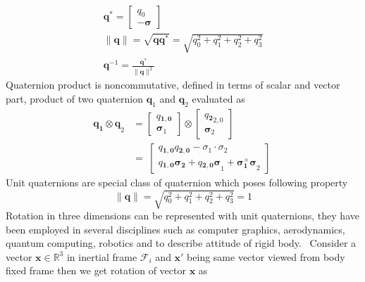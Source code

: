 \begin{gather}
\mathbf{q}^{*} =\begin{bmatrix}
q_{0}\\
-\mathbf{\sigma }
\end{bmatrix} \ \\
\| \mathbf{q} \| =\sqrt{\mathbf{qq}^{*}} =\sqrt{q^{2}_{0} +q^{2}_{1} +q^{2}_{2} +q^{2}_{3}}\\
\mathbf{q}^{-1} =\frac{\mathbf{q}^{*}}{\| \mathbf{q} \| ^{2}}
\end{gather}
Quaternion product is noncommutative, defined in terms of scalar and vector part, product of two quaternion $\displaystyle \mathbf{q}_{1}$ and $\displaystyle \mathbf{q}_{2}$ evaluated as 
\begin{equation}
\label{quatProduct}
\begin{aligned}
\mathbf{q_{1} \otimes q}_{2} & =\begin{bmatrix}
q\mathbf{_{1,0}}\\
{\mathbf{\sigma }_{1}}
\end{bmatrix} \otimes \begin{bmatrix}
{q\mathbf{_{2}}}_{2,0}\\
{\mathbf{\sigma }_{2}}
\end{bmatrix}\\
 & =\ \begin{bmatrix}
q\mathbf{_{1,0}} q\mathbf{_{2,0}} -\sigma _{1} \cdot \sigma _{2}\\
q\mathbf{_{1,0} \sigma _{2}} +q\mathbf{_{2,0} \sigma }_{1} +\mathbf{\sigma ^{\times }_{1} \sigma }_{2}
\end{bmatrix}
\end{aligned} \ 
\end{equation}
Unit quaternions are special class of quaternion which poses following property
\begin{equation}
\| \mathbf{q} \| =\sqrt{q^{2}_{0} +q^{2}_{1} +q^{2}_{2} +q^{2}_{3}} =1
\end{equation}
Rotation in three dimensions can be represented with unit quaternions, they have been employed in several disciplines such as computer graphics, aerodynamics, quantum computing, robotics and to describe attitude of rigid body. \ Consider a vector $\displaystyle \mathbf{x} \in \mathbb{R}^{3}$ in inertial frame $\displaystyle \mathcal{F}_{i}$ and $\displaystyle \mathbf{x} '$ being same vector viewed from body fixed frame then we get rotation of vector $\displaystyle \mathbf{x}$ as
